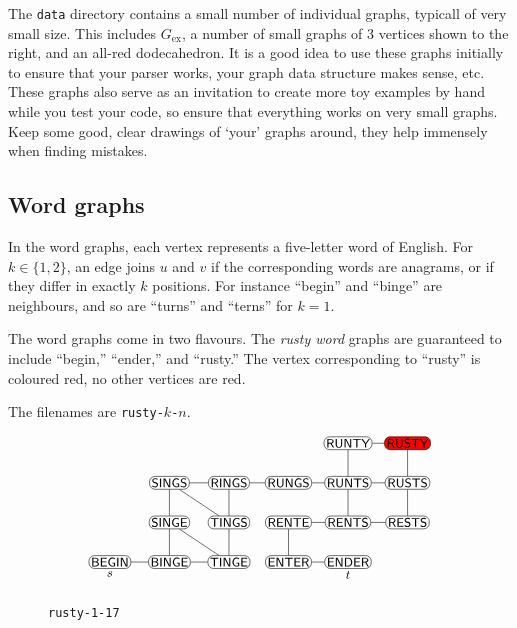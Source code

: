 \documentclass{tufte-handout}
\begin{document}
 The {\tt data} directory contains a small number of individual graphs, typicall of very small size.
 This includes $G_{\text{ex}}$, a number of small graphs of 3 vertices shown to the right, and an all-red dodecahedron.
 It is a good idea to use these graphs initially to ensure that your parser works, your graph data structure makes sense, etc.
These graphs also serve as an invitation to create more toy examples by hand while you test your code, so ensure that everything works on very small graphs.
Keep some good, clear drawings of `your' graphs around, they help immensely when finding mistakes.

\subsection{Word graphs}
In the word graphs, each vertex represents a five-letter word of English.
For $k\in\{1,2\}$, an edge joins $u$ and $v$ if the corresponding words are anagrams, or if they differ in exactly $k$ positions.
For instance ``begin'' and ``binge'' are neighbours, and so are ``turns'' and ``terns'' for $k=1$.

The word graphs  come in two flavours.
The \emph{rusty word} graphs are guaranteed to include ``begin,'' ``ender,'' and ``rusty.''
The vertex corresponding to ``rusty'' is coloured red, no other vertices are red.

The filenames are {\tt rusty-$k$-$n$}.
\begin{figure}
\[
\begin{tikzpicture}[
    xscale = 1.5,
    every node/.style={ draw,rectangle,
      rounded corners, inner sep = 1.5pt, font =\sf\small }
    ]
  \node (rungs) at (3,2) {RUNGS}; 
  \node (sings) at (1,2) {SINGS}; 
  \node (begin) [label = below:$s$] at (0,0) {BEGIN};
  \node (rents) at (4,1) {RENTS};
  \node (ender) [label = below:$t$] at (4,0) {ENDER};
  \node (rests) at (5,1) {RESTS};
  \node (binge) at (1,0) {BINGE};
  \node (singe) at (1,1) {SINGE};
  \node (rings) at (2,2) {RINGS};
  \node (rusty) [fill = red] at (5,3) {RUSTY};
  \node (rente) at (3,1) {RENTE};
  \node (runts) at (4,2) {RUNTS};
  \node (enter) at (3,0) {ENTER};
  \node (rusts) at (5,2) {RUSTS};
  \node (tinge) at (2,0) {TINGE};
  \node (tings) at (2,1) {TINGS};
  \node (runty) at (4,3) {RUNTY};
\draw (rungs) -- (runts) ;
\draw (sings) -- (tings) ;
\draw (sings) -- (rings) ;
\draw (sings) -- (singe) ;
\draw (begin) -- (binge) ;
\draw (rents) -- (rests) ;
\draw (rents) -- (rente) ;
\draw (rents) -- (runts) ;
\draw (ender) -- (enter) ;
\draw (rests) -- (rusts) ;
\draw (binge) -- (tinge) ;
\draw (binge) -- (singe) ;
\draw (singe) -- (tinge) ;
\draw (rings) -- (tings) ;
\draw (rusty) -- (rusts) ;
\draw (rusty) -- (runty) ;
\draw (rente) -- (enter) ;
\draw (runts) -- (rusts) ;
\draw (runts) -- (runty) ;
\draw (tinge) -- (tings) ;
\draw (rungs) -- (rings) ;
  \end{tikzpicture}
\]
\caption{{\tt rusty-1-17}}
\end{figure}
\end{document}
